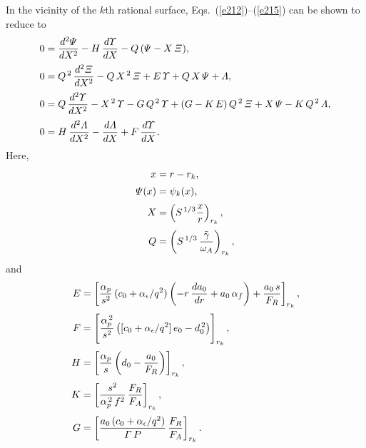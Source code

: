 \documentclass[12pt,prb,aps,notitlepage]{revtex4-1}
\begin{document}
In the vicinity of the $k$th rational surface, Eqs.~(\ref{e212})--(\ref{e215}) can be shown to reduce to
\begin{align}\label{e228}
0&= \frac{d^2{\mit\Psi}}{dX^2} - H\,\frac{d{\mit\Upsilon}}{dX} -Q\,({\mit\Psi}-X\,{\mit\Xi}),\\[0.5ex]
0&= Q^{\,2}\,\frac{d^2{\mit\Xi}}{dX^2} - Q\,X^{\,2}\,{\mit\Xi} + E\,{\mit\Upsilon}  +Q\,X\,{\mit\Psi}+{\mit\Lambda},\\[0.5ex]
0&= Q\,\frac{d^2{\mit\Upsilon}}{dX^2} - X^{\,2}\,{\mit\Upsilon} - G\,Q^{\,2}\,{\mit\Upsilon} + (G-K\,E)\,Q^{\,2}\,{\mit\Xi} 
+ X\,{\mit\Psi} - K\,Q^{\,2}\,{\mit\Lambda},\\[0.5ex]
0&= H\,\frac{d^2{\mit\Lambda}}{dX^2}-\frac{d{\mit\Lambda}}{dX}+ F\,\frac{d{\mit\Upsilon}}{dX}.\label{e231}
\end{align}
Here, 
\begin{align}
x&= r-r_k,\\[0.5ex]
{\mit\Psi}(x)&= \psi_k(x), \\[0.5ex]
X &= \left(S^{\,1/3}\frac{x}{r}\right)_{r_k},\\[0.5ex]
Q &= \left(S^{\,1/3}\,\frac{\tilde{\gamma}}{\omega_A}\right)_{r_k},
\end{align}
and
\begin{align}
E &= \left[\frac{\alpha_p}{s^2}\,(c_0+\alpha_\epsilon/q^2)\left(-r\,\frac{da_0}{dr} + a_0\,\alpha_f\right)+\frac{a_0\,s}{F_R}\right]_{r_k},\\[0.5ex]
F&=\left[ \frac{\alpha_p^{\,2}}{s^2}\left([c_0+\alpha_\epsilon/q^2]\,e_0 - d_0^{\,2}\right)\right]_{r_k},\\[0.5ex]
H &= \left[\frac{\alpha_p}{s}\left(d_0-\frac{a_0}{F_R}\right)\right]_{r_k},\\[0.5ex]
K &= \left[\frac{s^2}{\alpha_p^{\,2}\,f^2}\,\frac{F_R}{F_A}\right]_{r_k},\\[0.5ex]
G &=\left[\frac{a_0\,(c_0+\alpha_\epsilon/q^2)}{{\mit\Gamma}\,P}\,\frac{F_R}{F_A}\right]_{r_k}.
\end{align}
\end{document}
